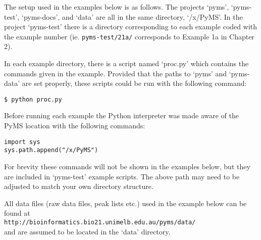 The setup used in the examples below is as follows. The projects `pyms',
`pyms-test', `pyms-docs', and `data' are all in the same directory,
`/x/PyMS'. In the project `pyms-test' there is a directory corresponding to
each example coded with the example number (ie. {\tt pyms-test/21a/}
corresponds to Example 1a in Chapter 2).

In each example directory, there is a script named `proc.py' which contains
the commands given in the example.  Provided that the paths to `pyms' and
`pyms-data' are set properly, these scripts could be run with the following
command:

\begin{verbatim}
$ python proc.py
\end{verbatim}

Before running each example the Python interpreter was made aware of the
PyMS location with the following commands:

\begin{verbatim}
import sys
sys.path.append("/x/PyMS")
\end{verbatim}

For brevity these commands will not be shown in the examples below, but
they are included in `pyms-test' example scripts.  The above path may need
to be adjusted to match your own directory structure.

All data files (raw data files, peak lists etc.) used in the example below
can be found at \\
{\tt http://bioinformatics.bio21.unimelb.edu.au/pyms/data/} \\
and are assumed to be located in the `data' directory.


